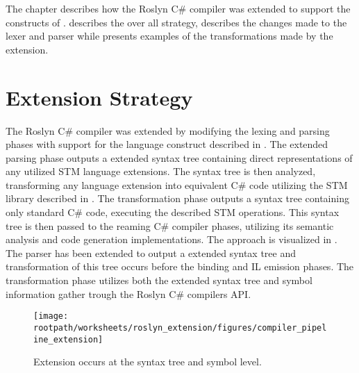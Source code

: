 \makeatletter {}\makeatother
{}
The chapter describes how the Roslyn C\# compiler was extended to support the constructs of \stmname.  describes the over all strategy,  describes the changes made to the lexer and parser while  presents examples of the transformations made by the extension.
\label{chap:roslyn_extension}
\section{Extension Strategy}
\label{sec:roslyn_extension_strategy}
The Roslyn C\# compiler was extended by modifying the lexing and parsing phases with support for the language construct described in . The extended parsing phase outputs a extended syntax tree containing direct representations of any utilized \ac{STM} language extensions. The syntax tree is then analyzed, transforming any language extension into equivalent C\# code utilizing the \ac{STM} library described in . The transformation phase outputs a syntax tree containing only standard C\# code, executing the described \ac{STM} operations. This syntax tree is then passed to the reaming C\# compiler phases, utilizing its semantic analysis and code generation implementations. The approach is visualized in . The parser has been extended to output a extended syntax tree and transformation of this tree occurs before the binding and IL emission phases. The transformation phase utilizes both the extended syntax tree and symbol information gather trough the Roslyn C\# compilers \ac{API}.
\begin{figure}[htbp]
\centering
 \texttt{[image: \\rootpath/worksheets/roslyn\_extension/figures/compiler\_pipeline\_extension]} 
 \caption{Extension occurs at the syntax tree and symbol level.}
\label{fig:compiler_pipeline_extension}
\end{figure}

